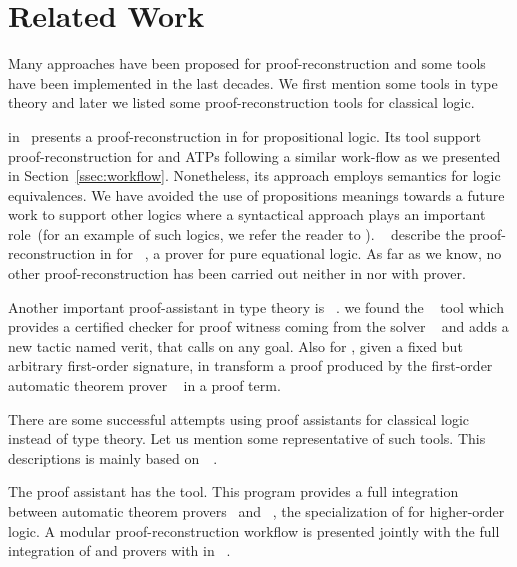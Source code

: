 \documentclass[../main.tex]{subfiles}
\begin{document}

\section{Related Work}
\label{sec:related-work}

Many approaches have been proposed for proof-reconstruction and some tools have
been implemented in the last decades. We first mention some tools in type
theory and later we listed some proof-reconstruction tools for classical logic.

\citeauthor{Kanso2012} in~\cite{Kanso2012,kanso2016light} presents a
proof-reconstruction in \Agda for propositional logic. Its tool support
proof-reconstruction for  and  ATPs following a similar work-flow as we presented in Section~\ref{ssec:workflow}.
Nonetheless, its approach
employs semantics for logic equivalences. We have avoided the use of
propositions meanings towards a future work to support other logics where a
syntactical approach plays an important role~(for an example of such logics, we
refer the reader to \cite{Agudelo-Agudelo2017}).
\citeauthor{foster2011integrating}~\cite{foster2011integrating} describe  the
proof-reconstruction in \Agda for ~\cite{hillenbrand1997}, a
prover for pure equational logic. As far as we know, no other
proof-reconstruction has been carried out neither in \Agda nor with \Metis prover.

Another important proof-assistant in type theory is ~\cite{coqteam}.
we found the ~\cite{armand2011,Ekici2017} tool which provides a
certified checker for proof witness coming from the \SMT solver
~\cite{bouton2009} and adds a new tactic named verit, that calls
 on any  goal. Also for , given a fixed but
arbitrary first-order signature, \citeauthor{Bezem2002} in \cite{Bezem2002}
transform a proof produced by the first-order automatic theorem prover
~\cite{deNivelle2003} in a  proof term.

There are some successful attempts using proof assistants for classical logic
instead of type theory.
Let us mention some representative of such tools. This descriptions is
mainly based on~\citeauthor{Sicard-Ramirez2016}~\cite{Sicard-Ramirez2016}.

The  proof assistant has the  tool.
This program provides a full integration between
automatic theorem provers~\cite{blanchette2013extending,Fleury2014,bohme2010} and
~\cite{nipkow2002isabelle}, the specialization of
 for higher-order logic.
A modular proof-reconstruction workflow is presented jointly with
the full integration of  and  provers with
 in \citeauthor{Een2004}~\cite{Een2004}.
\end{document}
